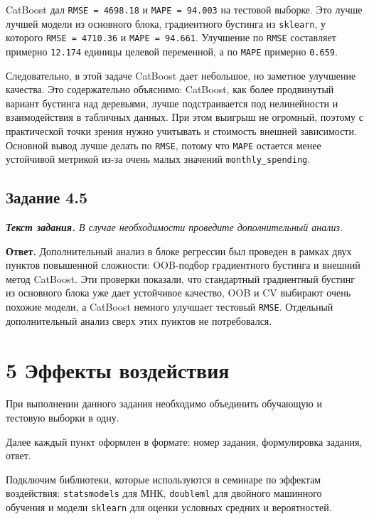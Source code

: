 \documentclass[11pt]{article}
\newenvironment{tasktext}
      {\begin{tcolorbox}[breakable, colback=black!3, colframe=black!28,
        boxrule=0.4pt, arc=1.5mm, left=7pt, right=7pt, top=5pt, bottom=5pt,
        before skip=0.35em, after skip=0.75em]\itshape}
      {\end{tcolorbox}}
\begin{document}
CatBoost дал \texttt{RMSE\ =\ 4698.18} и \texttt{MAPE\ =\ 94.003} на
тестовой выборке. Это лучше лучшей модели из основного блока,
градиентного бустинга из \texttt{sklearn}, у которого
\texttt{RMSE\ =\ 4710.36} и \texttt{MAPE\ =\ 94.661}. Улучшение по
\texttt{RMSE} составляет примерно \texttt{12.174} единицы целевой
переменной, а по \texttt{MAPE} примерно \texttt{0.659}.

Следовательно, в этой задаче CatBoost дает небольшое, но заметное
улучшение качества. Это содержательно объяснимо: CatBoost, как более
продвинутый вариант бустинга над деревьями, лучше подстраивается под
нелинейности и взаимодействия в табличных данных. При этом выигрыш не
огромный, поэтому с практической точки зрения нужно учитывать и
стоимость внешней зависимости. Основной вывод лучше делать по
\texttt{RMSE}, потому что \texttt{MAPE} остается менее устойчивой
метрикой из-за очень малых значений \texttt{monthly\_spending}.

    \subsection{Задание 4.5}\label{ux437ux430ux434ux430ux43dux438ux435-4.5}

\begin{tasktext}
\textbf{Текст задания.} В случае необходимости проведите дополнительный
анализ.
\end{tasktext}

\textbf{Ответ.} Дополнительный анализ в блоке регрессии был проведен в
рамках двух пунктов повышенной сложности: OOB-подбор градиентного
бустинга и внешний метод CatBoost. Эти проверки показали, что
стандартный градиентный бустинг из основного блока уже дает устойчивое
качество, OOB и CV выбирают очень похожие модели, а CatBoost немного
улучшает тестовый \texttt{RMSE}. Отдельный дополнительный анализ сверх
этих пунктов не потребовался.

    \section{5 Эффекты
воздействия}\label{ux44dux444ux444ux435ux43aux442ux44b-ux432ux43eux437ux434ux435ux439ux441ux442ux432ux438ux44f}

При выполнении данного задания необходимо объединить обучающую и
тестовую выборки в одну.

Далее каждый пункт оформлен в формате: номер задания, формулировка
задания, ответ.

    Подключим библиотеки, которые используются в семинаре по эффектам
воздействия: \texttt{statsmodels} для МНК, \texttt{doubleml} для
двойного машинного обучения и модели \texttt{sklearn} для оценки
условных средних и вероятностей.
\end{document}
